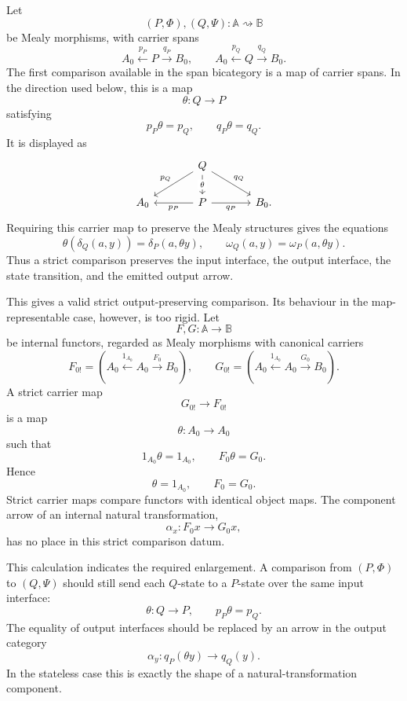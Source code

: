 Let
\[
    (P,\Phi),(Q,\Psi):\mathbb A\rightsquigarrow\mathbb B
\]
be Mealy morphisms, with carrier spans
\[
    A_0\xleftarrow{p_P}P\xrightarrow{q_P}B_0,
    \qquad
    A_0\xleftarrow{p_Q}Q\xrightarrow{q_Q}B_0.
\]
The first comparison available in the span bicategory is a map of carrier spans. In the direction used below, this is a map
\[
    \theta:Q\to P
\]
satisfying
\[
    p_P\theta=p_Q,
    \qquad
    q_P\theta=q_Q.
\]
It is displayed as
\[
    \begin{tikzcd}[column sep=large]
        &
            Q
                \arrow[d, "\theta" description]
                \arrow[dl, "p_Q"']
                \arrow[dr, "q_Q"]
        &
        \\
            A_0
        &
            P
                \arrow[l, "p_P"]
                \arrow[r, "q_P"']
        &
            B_0.
    \end{tikzcd}
\]
Requiring this carrier map to preserve the Mealy structures gives the equations
\[
    \theta(\delta_Q(a,y))
    =
    \delta_P(a,\theta y),
    \qquad
    \omega_Q(a,y)
    =
    \omega_P(a,\theta y).
\]
Thus a strict comparison preserves the input interface, the output interface, the state transition, and the emitted output arrow.

This gives a valid strict output-preserving comparison. Its behaviour in the map-representable case, however, is too rigid. Let
\[
    F,G:\mathbb A\to\mathbb B
\]
be internal functors, regarded as Mealy morphisms with canonical carriers
\[
    F_{0!}
    =
    \left(
        A_0
        \xleftarrow{1_{A_0}}
        A_0
        \xrightarrow{F_0}
        B_0
    \right),
    \qquad
    G_{0!}
    =
    \left(
        A_0
        \xleftarrow{1_{A_0}}
        A_0
        \xrightarrow{G_0}
        B_0
    \right).
\]
A strict carrier map
\[
    G_{0!}\to F_{0!}
\]
is a map
\[
    \theta:A_0\to A_0
\]
such that
\[
    1_{A_0}\theta=1_{A_0},
    \qquad
    F_0\theta=G_0.
\]
Hence
\[
    \theta=1_{A_0},
    \qquad
    F_0=G_0.
\]
Strict carrier maps compare functors with identical object maps. The component arrow of an internal natural transformation,
\[
    \alpha_x:F_0x\to G_0x,
\]
has no place in this strict comparison datum.

This calculation indicates the required enlargement. A comparison from \((P,\Phi)\) to \((Q,\Psi)\) should still send each \(Q\)-state to a \(P\)-state over the same input interface:
\[
    \theta:Q\to P,
    \qquad
    p_P\theta=p_Q.
\]
The equality of output interfaces should be replaced by an arrow in the output category
\[
    \alpha_y:q_P(\theta y)\to q_Q(y).
\]
In the stateless case this is exactly the shape of a natural-transformation component.


